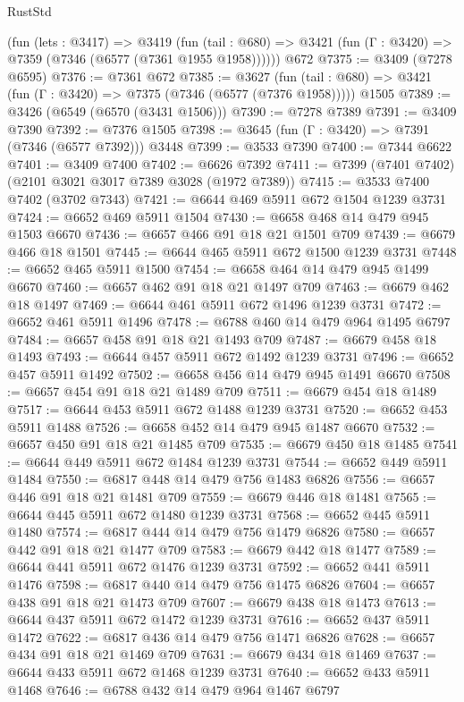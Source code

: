 \begin{lexlean}{RustStd}
\begin{coremodule}
    (fun (lets : @3417) =>
    @3419
      (fun (tail : @680) => @3421 (fun (Γ : @3420) => @7359 (@7346 (@6577 (@7361 @1955 @1958))))))
    @672
@7375 := @3409 (@7278 @6595)
@7376 := @7361 @672
@7385 := @3627
    (fun (tail : @680) => @3421 (fun (Γ : @3420) => @7375 (@7346 (@6577 (@7376 @1958)))))
    @1505
@7389 := @3426 (@6549 (@6570 (@3431 @1506)))
@7390 := @7278 @7389
@7391 := @3409 @7390
@7392 := @7376 @1505
@7398 := @3645 (fun (Γ : @3420) => @7391 (@7346 (@6577 @7392))) @3448
@7399 := @3533 @7390
@7400 := @7344 @6622
@7401 := @3409 @7400
@7402 := @6626 @7392
@7411 := @7399 (@7401 @7402) (@2101 @3021 @3017 @7389 @3028 (@1972 @7389))
@7415 := @3533 @7400 @7402 (@3702 @7343)
@7421 := @6644 @469 @5911 @672 @1504 @1239 @3731
@7424 := @6652 @469 @5911 @1504
@7430 := @6658 @468 @14 @479 @945 @1503 @6670
@7436 := @6657 @466 @91 @18 @21 @1501 @709
@7439 := @6679 @466 @18 @1501
@7445 := @6644 @465 @5911 @672 @1500 @1239 @3731
@7448 := @6652 @465 @5911 @1500
@7454 := @6658 @464 @14 @479 @945 @1499 @6670
@7460 := @6657 @462 @91 @18 @21 @1497 @709
@7463 := @6679 @462 @18 @1497
@7469 := @6644 @461 @5911 @672 @1496 @1239 @3731
@7472 := @6652 @461 @5911 @1496
@7478 := @6788 @460 @14 @479 @964 @1495 @6797
@7484 := @6657 @458 @91 @18 @21 @1493 @709
@7487 := @6679 @458 @18 @1493
@7493 := @6644 @457 @5911 @672 @1492 @1239 @3731
@7496 := @6652 @457 @5911 @1492
@7502 := @6658 @456 @14 @479 @945 @1491 @6670
@7508 := @6657 @454 @91 @18 @21 @1489 @709
@7511 := @6679 @454 @18 @1489
@7517 := @6644 @453 @5911 @672 @1488 @1239 @3731
@7520 := @6652 @453 @5911 @1488
@7526 := @6658 @452 @14 @479 @945 @1487 @6670
@7532 := @6657 @450 @91 @18 @21 @1485 @709
@7535 := @6679 @450 @18 @1485
@7541 := @6644 @449 @5911 @672 @1484 @1239 @3731
@7544 := @6652 @449 @5911 @1484
@7550 := @6817 @448 @14 @479 @756 @1483 @6826
@7556 := @6657 @446 @91 @18 @21 @1481 @709
@7559 := @6679 @446 @18 @1481
@7565 := @6644 @445 @5911 @672 @1480 @1239 @3731
@7568 := @6652 @445 @5911 @1480
@7574 := @6817 @444 @14 @479 @756 @1479 @6826
@7580 := @6657 @442 @91 @18 @21 @1477 @709
@7583 := @6679 @442 @18 @1477
@7589 := @6644 @441 @5911 @672 @1476 @1239 @3731
@7592 := @6652 @441 @5911 @1476
@7598 := @6817 @440 @14 @479 @756 @1475 @6826
@7604 := @6657 @438 @91 @18 @21 @1473 @709
@7607 := @6679 @438 @18 @1473
@7613 := @6644 @437 @5911 @672 @1472 @1239 @3731
@7616 := @6652 @437 @5911 @1472
@7622 := @6817 @436 @14 @479 @756 @1471 @6826
@7628 := @6657 @434 @91 @18 @21 @1469 @709
@7631 := @6679 @434 @18 @1469
@7637 := @6644 @433 @5911 @672 @1468 @1239 @3731
@7640 := @6652 @433 @5911 @1468
@7646 := @6788 @432 @14 @479 @964 @1467 @6797

\end{coremodule}
\end{lexlean}
